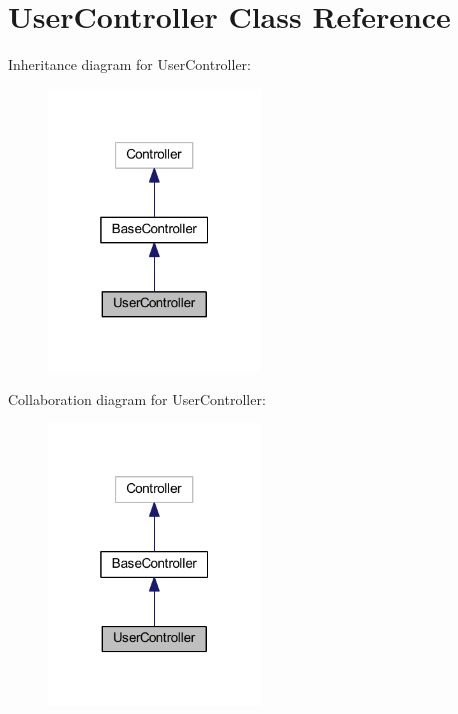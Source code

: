 \hypertarget{class_user_controller}{}\section{User\+Controller Class Reference}
\label{class_user_controller}


Inheritance diagram for User\+Controller\+:
\nopagebreak
\begin{figure}[H]
\begin{center}
\leavevmode
\includegraphics[width=160pt]{class_user_controller__inherit__graph}
\end{center}
\end{figure}


Collaboration diagram for User\+Controller\+:
\nopagebreak
\begin{figure}[H]
\begin{center}
\leavevmode
\includegraphics[width=160pt]{class_user_controller__coll__graph}
\end{center}
\end{figure}
